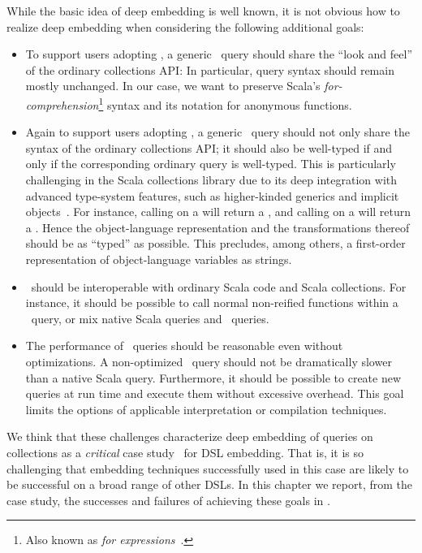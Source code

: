 While the basic idea of deep embedding is well known, it is not obvious how to realize deep embedding
when considering the following additional goals:

\begin{itemize}
\item To support users adopting \LoS, a generic \LoS\ query should share the ``look and feel'' of the ordinary collections API: In particular, query syntax should remain mostly unchanged. In our case, we want to preserve  Scala's \emph{for-comprehension}\footnote{Also known as \emph{for expressions}~\citep[Ch.~23]{Odersky11book}.} syntax and its notation
 for anonymous functions.
 \item Again to support users adopting \LoS, a generic \LoS\ query should not only share the syntax of the ordinary collections API; it should also be well-typed if and only if the corresponding ordinary query is well-typed.
 This is particularly challenging in the Scala collections
 library due to its deep integration with advanced type-system features, such as higher-kinded generics
 and implicit objects~\citep{odersky2009fighting}. For instance, calling  on a  will return a , and calling  on a 
 will return a . Hence the object-language representation and the
 transformations thereof should be as ``typed'' as possible. This precludes, among others, a first-order
 representation of object-language variables as strings.
 \item \LoS\ should be interoperable with ordinary Scala code and Scala collections. For instance, it should
 be possible to call normal non-reified functions within a \LoS\ query, or mix native Scala queries and \LoS\ queries.
 \item The performance of \LoS\ queries should be reasonable even without optimizations. A non-optimized \LoS\ query
 should not be dramatically slower than a native Scala query. Furthermore, it should be possible to create new queries at run time and execute them without excessive overhead.
 This goal limits the options of applicable interpretation or compilation techniques.
\end{itemize}

We think that these challenges characterize deep embedding of queries on collections as a \emph{critical} case study~\citep{flyvbjerg06five} for DSL embedding.
That is, it is so challenging that embedding techniques successfully used in this case are likely to be successful on a broad range of other DSLs.
In this chapter we report, from the case study, the successes and failures of achieving these goals in \LoS.
